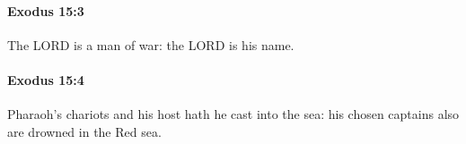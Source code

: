		\paragraph{Exodus 15:3} %
			\label{EXODUS-15-3}

			The LORD is a man of war: the LORD is his name.


		\paragraph{Exodus 15:4} %
			\label{EXODUS-15-4}

			Pharaoh's chariots and his host hath he cast into the sea: his chosen captains also are drowned in the Red sea.


